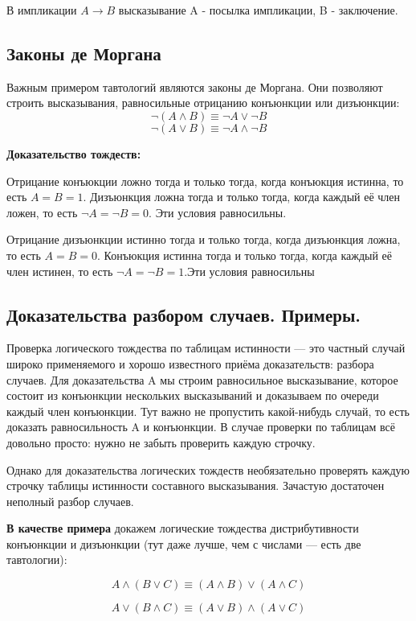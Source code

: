 \documentclass[a4paper, 10pt]{article}
\begin{document}
В импликации $A \to B$ высказывание A - посылка импликации, B - заключение.


\subsection{Законы де Моргана}

Важным примером тавтологий являются законы де Моргана. Они позволяют строить высказывания, равносильные отрицанию конъюнкции или дизъюнкции: \\
$$\neg(A \wedge B) \equiv \neg A \vee \neg B$$  $$\neg(A \vee B) \equiv \neg A \wedge \neg B$$

\textbf{Доказательство тождеств:}

Отрицание конъюкции ложно тогда и только тогда, когда конъюкция истинна, то есть $A = B = 1$. Дизъюнкция ложна тогда и только тогда, когда каждый её член ложен, то есть $\neg A = \neg B = 0$. Эти условия равносильны.

Отрицание дизъюнкции истинно тогда и только тогда, когда дизъюнкция ложна, то есть $A = B = 0$. Конъюкция  истинна тогда и только тогда, когда каждый её член истинен, то есть $\neg A = \neg B = 1$.Эти условия равносильны

\subsection{Доказательства разбором случаев. Примеры.}

Проверка логического тождества по таблицам истинности — это частный случай широко применяемого и хорошо известного приёма доказательств: разбора случаев. Для доказательства A мы строим равносильное высказывание, которое состоит из конъюнкции нескольких высказываний и доказываем по очереди каждый член конъюнкции. Тут важно не пропустить какой-нибудь случай, то есть доказать равносильность A и конъюнкции. В случае проверки по таблицам всё довольно просто: нужно не забыть проверить каждую строчку.

Однако для доказательства логических тождеств необязательно проверять каждую строчку таблицы истинности составного высказывания. Зачастую достаточен неполный разбор случаев.

\textbf{В качестве примера} докажем логические тождества дистрибутивности конъюнкции и дизъюнкции (тут даже лучше, чем с числами — есть две тавтологии):

$$A \wedge (B \vee C) \equiv (A \wedge B) \vee (A \wedge C)$$

$$A \vee (B \wedge C) \equiv (A \vee B) \wedge (A \vee C)$$
\end{document}
